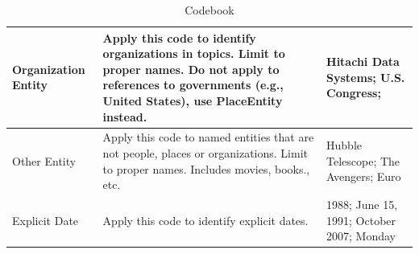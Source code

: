 \documentclass[runningheads,a4paper]{llncs}
\begin{document}
\begin{table}
{\begin{tabular}{| p{3cm} | p{6cm}  | p{6cm} |}
Organization Entity & Apply this code to identify organizations in topics. Limit to proper names. Do not apply to references to governments (e.g., United States), use PlaceEntity instead. & Hitachi Data Systems; U.S. Congress; \\ \hline
Other Entity & Apply this code to named entities that are not people, places or organizations. Limit to proper names. Includes movies, books., etc. & Hubble Telescope; The Avengers; Euro	\\ \hline
Explicit Date & Apply this code to identify explicit dates. & 1988; June 15, 1991; October 2007; Monday \\ \hline
\end{tabular}}
\caption{Codebook}
\label{table.codebook}
\end{table}
\end{document}
